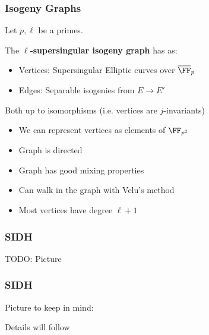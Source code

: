 \documentclass{beamer}
\begin{document}
\begin{frame}
    \frametitle{Isogeny Graphs}
    Let $p, \ell$ be a primes.
    \begin{definition}
        The $\ell$\textbf{-supersingular isogeny graph} has as:
        \begin{itemize}
            \item Vertices: Supersingular Elliptic curves over $\overline{\FF}_p$
            \item Edges: Separable isogenies from $E \to E'$
        \end{itemize}
        Both up to isomorphisms (i.e. vertices are $j$-invariants)
    \end{definition}
    \begin{itemize}
        \item We can represent vertices as elements of $\FF_{p^2}$
        \item Graph is directed
        \item Graph has good mixing properties
        \item Can walk in the graph with Velu's method
        \item Most vertices have degree $\ell + 1$
    \end{itemize} 

\end{frame}

\begin{frame}
    \frametitle{SIDH} 
    TODO: Picture

\end{frame}

\begin{frame}
    \frametitle{SIDH}
    Picture to keep in mind:
\begin{center}
\end{center}
Details will follow
\end{frame}
\end{document}
